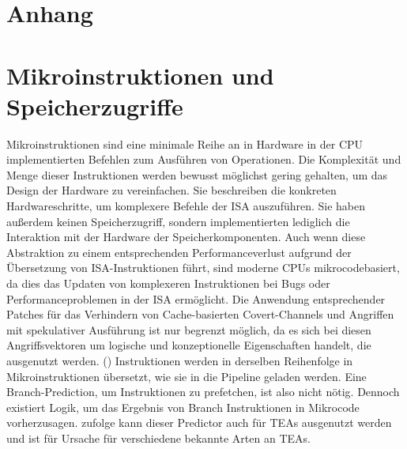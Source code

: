 \section*{Anhang}
\appendix

\makeatletter
{}
\makeatother

\section{Mikroinstruktionen und Speicherzugriffe}
\label{appendix:microinstructions}
Mikroinstruktionen sind eine minimale Reihe an in Hardware
in der \ac{CPU} implementierten Befehlen zum Ausführen von
Operationen. Die Komplexität und Menge
dieser Instruktionen werden bewusst möglichst gering gehalten,
um das Design der Hardware zu vereinfachen. Sie
beschreiben die konkreten Hardwareschritte, um komplexere
Befehle der \ac{ISA} auszuführen. Sie haben außerdem keinen
Speicherzugriff, sondern implementierten lediglich die
Interaktion mit der Hardware der Speicherkomponenten.
Auch wenn diese Abstraktion zu einem entsprechenden
Performanceverlust aufgrund der Übersetzung von
\ac{ISA}-Instruktionen führt, sind moderne \acp{CPU}
mikrocodebasiert, da dies das Updaten von komplexeren
Instruktionen bei Bugs oder Performanceproblemen in der \ac{ISA}
ermöglicht. Die Anwendung entsprechender Patches für das
Verhindern von Cache-basierten Covert-Channels und Angriffen
mit spekulativer Ausführung ist nur begrenzt möglich, da es
sich bei diesen Angriffsvektoren um logische und konzeptionelle
Eigenschaften handelt, die ausgenutzt werden.
(\cite[380,386,395]{sarangi_basic_2021})
Instruktionen werden in derselben Reihenfolge in
Mikroinstruktionen übersetzt, wie sie in die Pipeline geladen
werden. Eine Branch-Prediction, um Instruktionen zu prefetchen,
ist also nicht nötig.
Dennoch existiert Logik, um das Ergebnis von Branch
Instruktionen in Mikrocode vorherzusagen. \cite[6,7]{mosier_analyzing_2025}
zufolge kann dieser Predictor auch für \acp{TEA} ausgenutzt werden
und ist für Ursache für verschiedene bekannte Arten an \acp{TEA}.

